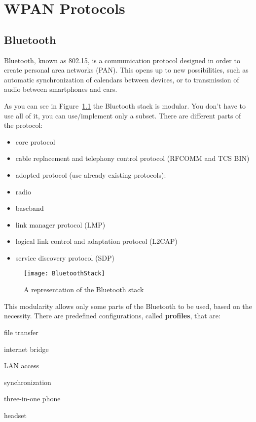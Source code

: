 \chapter{WPAN Protocols}

\section{Bluetooth}
Bluetooth, known as 802.15, is a communication protocol designed in order to
create personal area networks (PAN). This opens up to new possibilities, such
as automatic synchronization of calendars between devices, or to transmission
of audio between smartphones and cars.

As you can see in Figure~\ref{fig:bt:btstack} the Bluetooth stack is modular.
You don't have to use all of it, you can use/implement only a subset. There are
different parts of the protocol:
\begin{itemize}
\item core protocol
\item cable replacement and telephony control protocol (RFCOMM and TCS BIN)
\item adopted protocol (use already existing protocols):
\item radio
\item baseband
\item link manager protocol (LMP)
\item logical link control and adaptation protocol (L2CAP)
\item service discovery protocol (SDP)
\end{itemize}

\begin{figure}[t]
  \centering
  \texttt{[image: BluetoothStack]}
  \caption[Bluetooth stack]{A representation of the Bluetooth stack}
  \label{fig:bt:btstack}
\end{figure}

This modularity allows only some parts of the Bluetooth to be used, based on
the necessity. There are predefined configurations, called \textbf{profiles},
that are:
\begin{AutoMultiColItemize}
\item file transfer
\item internet bridge
\item LAN access
\item synchronization
\item three-in-one phone
\item headset
\end{AutoMultiColItemize}

